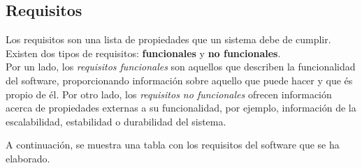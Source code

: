 \documentclass[../main.tex]{subfiles}
\begin{document}
\subsection{Requisitos}
Los requisitos son una lista de propiedades que un sistema debe de cumplir. Existen dos tipos de requisitos: \textbf{funcionales} y \textbf{no funcionales}.\\

Por un lado, los \textit{requisitos funcionales} son aquellos que describen la funcionalidad del software, proporcionando información sobre aquello que puede hacer y que és propio de él. Por otro lado, los \textit{requisitos no funcionales} ofrecen información acerca de propiedades externas a su funcionalidad, por ejemplo, información de la escalabilidad, estabilidad o durabilidad del sistema.

A continuación, se muestra una tabla con los requisitos del software que se ha elaborado.
\end{document}
